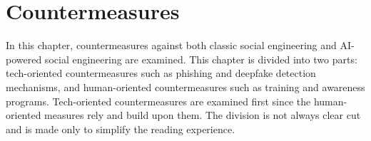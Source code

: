 



\chapter{Countermeasures\label{chapter:countermeasures}}
\begin{comment}


\end{comment}

In this chapter, countermeasures against both classic social engineering and AI-powered social engineering are examined. This chapter is divided into two parts: tech-oriented countermeasures such as phishing and deepfake detection mechanisms, and human-oriented countermeasures such as training and awareness programs. Tech-oriented countermeasures are examined first since the human-oriented measures rely and build upon them. The division is not always clear cut and is made only to simplify the reading experience.

